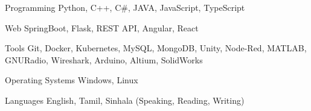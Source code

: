 

\begin{cvskills}

\cvskill
{Programming} %
{Python, C++, C\#, JAVA, JavaScript, TypeScript} %






\cvskill
{Web} %
{SpringBoot, Flask, REST API, Angular, React} %


\cvskill
{Tools} %
{Git, Docker, Kubernetes, MySQL, MongoDB, Unity, Node-Red, MATLAB, GNURadio, Wireshark, Arduino, Altium, SolidWorks} %


\cvskill
{Operating Systems} %
{Windows, Linux} %


\cvskill
{Languages} %
{English, Tamil, Sinhala (Speaking, Reading, Writing)} %

\end{cvskills}

